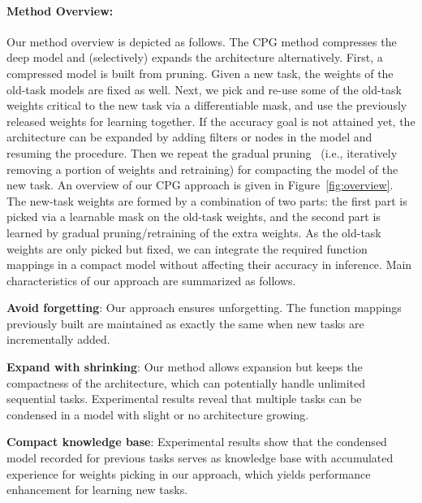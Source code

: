 \documentclass{article}
\begin{document}
\paragraph{Method Overview:}
Our method overview is depicted as follows.
The CPG method compresses the deep model and (selectively) expands the architecture alternatively. 
First, a compressed model is built from pruning.
Given a new task, the weights of the old-task models are fixed as well.
Next, we pick and re-use some of the old-task weights critical to the new task via a differentiable mask, and use the previously released weights for learning together.
If the accuracy goal is not attained yet, the architecture can be expanded by adding filters or nodes in the model and resuming the procedure.
Then we repeat the gradual pruning~\cite{h.2018to} (i.e., iteratively removing a portion of weights and retraining) for compacting the model of the new task.
An overview of our CPG approach is given in Figure~\ref{fig:overview}.
The new-task weights are formed by a combination of two parts: the first part is picked via a learnable mask on the old-task weights, and the second part is learned by gradual pruning/retraining of the extra weights.
As the old-task weights are only picked but fixed, we can integrate the required function mappings in a compact model without affecting their accuracy in inference.
Main characteristics of our approach are summarized as follows.

\noindent\textbf{Avoid forgetting}: Our approach ensures unforgetting. The function mappings previously built are maintained as exactly the same when new tasks are incrementally added.

\noindent\textbf{Expand with shrinking}: Our method allows expansion but keeps the compactness of the architecture, which can potentially handle unlimited sequential tasks. Experimental results reveal that multiple tasks can be condensed in a model with slight or no architecture growing.

\noindent\textbf{Compact knowledge base}: Experimental results show that the condensed model recorded for previous tasks serves as knowledge base with accumulated experience for weights picking in our approach, which yields performance enhancement for learning new tasks.
\end{document}
